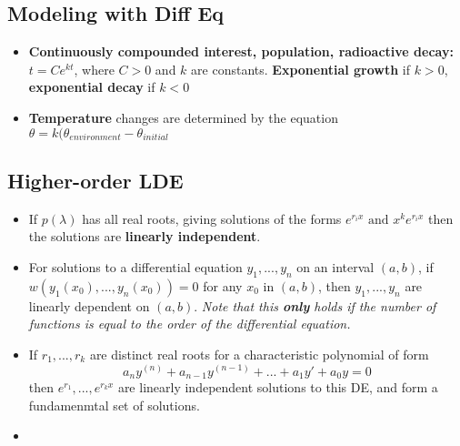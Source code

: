 \documentclass[10pt,letterpaper]{article}
\begin{document}
\subsection*{Modeling with Diff Eq}

\begin{itemize}
\item \textbf{Continuously compounded interest, population, radioactive decay:} 
$t=Ce^{kt}$, where $C>0$ and $k$ are constants. \textbf{Exponential growth} if $k>0$, \textbf{exponential decay} if $k<0$

\item \textbf{Temperature} changes are determined by the equation 
$\theta = k(\theta_{environment} - \theta_{initial}$

\end{itemize}

\subsection*{Higher-order LDE}

\begin{itemize}
\item If $p(\lambda)$ has all real roots, giving solutions of the forms $e^{r_ix}\mbox{ and }x^ke^{r_ix}$
then the solutions are \textbf{linearly independent}.

\item For solutions to a differential equation $y_1,...,y_n$ on an interval $(a,b)$, if $w(y_1(x_0),...,y_n(x_0))=0$ for any $x_0$ in $(a,b)$, then $y_1,...,y_n$ are linearly dependent on $(a,b)$. \textit{Note that this \textbf{only} holds if the number of functions is equal to the order of the differential equation.}

\item If $r_1,...,r_k$ are distinct real roots for a characteristic polynomial of form 
$$a_ny^{(n)}+a_{n-1}y^{(n-1)}+...+a_1y'+a_0y=0$$
then $e^{r_1},...,e^{r_kx}$ are linearly independent solutions to this DE, and form a fundamenmtal set of solutions. 

\item 

\end{itemize}
\end{document}
